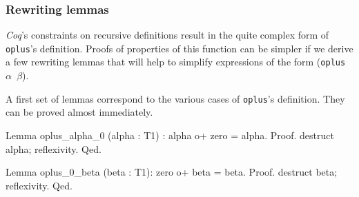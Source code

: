     \subsubsection{Rewriting lemmas}
    \label{sec:orgheadline86}

    \emph{Coq}'s constraints on recursive definitions result in 
    the quite  complex form of \texttt{oplus}'s definition.
    Proofs of properties of this function can be simpler if we
     derive a few  rewriting lemmas that will help to simplify 
    expressions of the form (\texttt{oplus $\alpha$ $\beta$}).

    A first set of lemmas correspond to the various cases of \texttt{oplus}'s 
    definition. They can be proved almost immediately.

    \begin{Coqsrc}
    Lemma oplus_alpha_0 (alpha : T1) : alpha o+ zero = alpha.
    Proof.
      destruct alpha; reflexivity.
    Qed.

    Lemma oplus_0_beta (beta : T1): zero o+ beta = beta.
    Proof.
      destruct beta; reflexivity.
    Qed.
    \end{Coqsrc}









